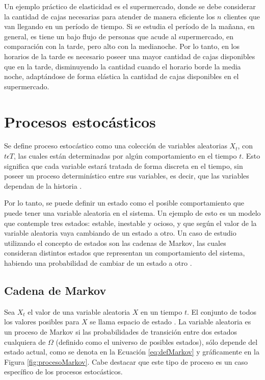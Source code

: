 Un ejemplo práctico de elasticidad es el supermercado, donde se debe considerar la cantidad de cajas necesarias para atender de manera eficiente los $n$ clientes que van llegando en un período de tiempo. Si se estudia el período de la mañana, en general, es tiene un bajo flujo de personas que acude al supermercado, en comparación con la tarde, pero alto con la medianoche. Por lo tanto, en los horarios de la tarde es necesario poseer una mayor cantidad de cajas disponibles que en la tarde, disminuyendo la cantidad cuando el horario borde la media noche, adaptándose de forma elástica la cantidad de cajas disponibles en el supermercado.

\section{Procesos estocásticos}
\label{sec:procesosEstocasticos}

Se define proceso estocástico como una colección de variables aleatorias {$X_t$, con $t \epsilon T$}, las cuales están determinadas por algún comportamiento en el tiempo $t$. Esto significa que cada variable estará tratada de forma discreta en el tiempo, sin poseer un proceso determinístico entre sus variables, es decir, que las variables dependan de la historia \citep{taylor2014introduction}.

Por lo tanto, se puede definir un estado como el posible comportamiento que puede tener una variable aleatoria en el sistema. Un ejemplo de esto es un modelo que contemple tres estados: estable, inestable y ocioso, y que según el valor de la variable aleatoria vaya cambiando de un estado a otro. Un caso de estudio utilizando el concepto de estados son las cadenas de Markov, las cuales consideran distintos estados que representan un comportamiento del sistema, habiendo una probabilidad de cambiar de un estado a otro \citep{de1978calculus}.

\subsection{Cadena de Markov}
\label{subsec:cadenaMarkov}

Sea $X_t$ el valor de una variable aleatoria $X$ en un tiempo $t$. El conjunto de todos los valores posibles para $X$ se llama espacio de estado \citep{ching2006markov}. La variable aleatoria es un proceso de Markov si las probabilidades de transición entre dos estados cualquiera de $\Omega$ (definido como el universo de posibles estados), sólo depende del estado actual, como se denota en la Ecuación \ref{eq:defMarkov} y gráficamente en la Figura \ref{fig:procesoMarkov}. Cabe destacar que este tipo de proceso es un caso específico de los procesos estocásticos.

